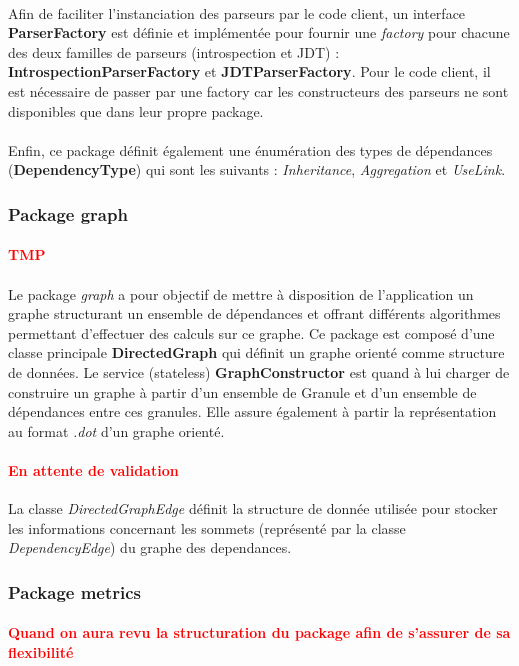 \documentclass{scrartcl}
\newcommand{\TODO}[1] {
    \noindent \paragraph{\textcolor{red}{#1}}
}
\begin{document}
	\paragraph{} Afin de faciliter l'instanciation des parseurs par le code client, un interface \textbf{ParserFactory} est définie et implémentée pour fournir une \emph{factory} pour chacune des deux familles de parseurs (introspection et JDT) : \textbf{IntrospectionParserFactory} et \textbf{JDTParserFactory}. Pour le code client, il est nécessaire de passer par une factory car les constructeurs des parseurs ne sont disponibles que dans leur propre package.
	
	\paragraph{} Enfin, ce package définit également une énumération des types de dépendances (\textbf{DependencyType}) qui sont les suivants : \emph{Inheritance}, \emph{Aggregation} et \emph{UseLink}.
    
\subsubsection{Package graph}
    \TODO{TMP}
    \paragraph{}Le package \emph{graph} a pour objectif de mettre à disposition de l’application un graphe structurant un ensemble de dépendances et offrant différents algorithmes permettant d’effectuer des calculs sur ce graphe. Ce package est composé d’une classe principale \textbf{DirectedGraph} qui définit un graphe orienté comme structure de données.
    Le service (stateless) \textbf{GraphConstructor} est quand à lui charger de construire un graphe à partir d’un ensemble de Granule et d’un ensemble de dépendances entre ces granules. Elle assure également à partir  la représentation au format \emph{.dot} d'un graphe orienté.
    
    \TODO{En attente de validation} 
    La classe \emph{DirectedGraphEdge} définit la structure de donnée utilisée pour stocker les informations concernant les sommets (représenté par la classe \emph{DependencyEdge}) du graphe des dependances.

\subsubsection{Package metrics}
    \TODO{Quand on aura revu la structuration du package afin de s'assurer de sa flexibilité}
\end{document}
